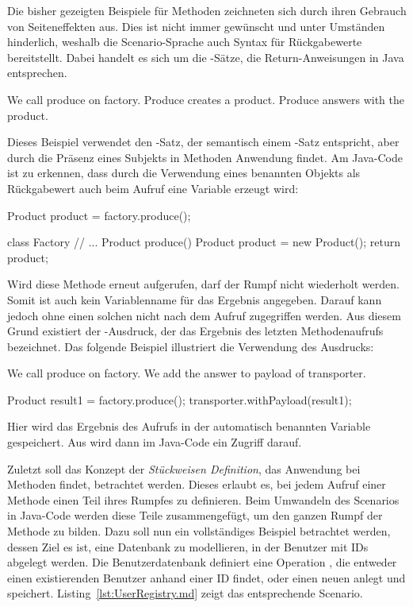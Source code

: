 Die bisher gezeigten Beispiele für Methoden zeichneten sich durch ihren Gebrauch von Seiteneffekten aus.
Dies ist nicht immer gewünscht und unter Umständen hinderlich, weshalb die Scenario-Sprache auch Syntax für Rückgabewerte bereitstellt.
Dabei handelt es sich um die -Sätze, die Return-Anweisungen in Java entsprechen.

\begin{codeblock}
    We call produce on factory.
    Produce creates a product.
    Produce answers with the product.
\end{codeblock}

Dieses Beispiel verwendet den -Satz, der semantisch einem -Satz entspricht, aber durch die Präsenz eines Subjekts in Methoden Anwendung findet.
Am Java-Code ist zu erkennen, dass durch die Verwendung eines benannten Objekts als Rückgabewert auch beim Aufruf eine Variable erzeugt wird:

\begin{jcodeblock}
    Product product = factory.produce();

    class Factory {
        // ...
        Product produce() {
            Product product = new Product();
            return product;
        }
    }
\end{jcodeblock}

Wird diese Methode erneut aufgerufen, darf der Rumpf nicht wiederholt werden.
Somit ist auch kein Variablenname für das Ergebnis angegeben.
Darauf kann jedoch ohne einen solchen nicht nach dem Aufruf zugegriffen werden.
Aus diesem Grund existiert der -Ausdruck, der das Ergebnis des letzten Methodenaufrufs bezeichnet.
Das folgende Beispiel illustriert die Verwendung des Ausdrucks:

\begin{codeblock}
    We call produce on factory.
    We add the answer to payload of transporter.
\end{codeblock}

\begin{jcodeblock}
    Product result1 = factory.produce();
    transporter.withPayload(result1);
\end{jcodeblock}

Hier wird das Ergebnis des Aufrufs in der automatisch benannten Variable  gespeichert.
Aus  wird dann im Java-Code ein Zugriff darauf.

Zuletzt soll das Konzept der \emph{Stückweisen Definition}, das Anwendung bei Methoden findet, betrachtet werden.
Dieses erlaubt es, bei jedem Aufruf einer Methode einen Teil ihres Rumpfes zu definieren.
Beim Umwandeln des Scenarios in Java-Code werden diese Teile zusammengefügt, um den ganzen Rumpf der Methode zu bilden.
Dazu soll nun ein vollständiges Beispiel betrachtet werden, dessen Ziel es ist, eine Datenbank zu modellieren, in der Benutzer mit IDs abgelegt werden.
Die Benutzerdatenbank definiert eine Operation , die entweder einen existierenden Benutzer anhand einer ID findet, oder einen neuen anlegt und speichert.
Listing~\ref{lst:UserRegistry.md} zeigt das entsprechende Scenario.

